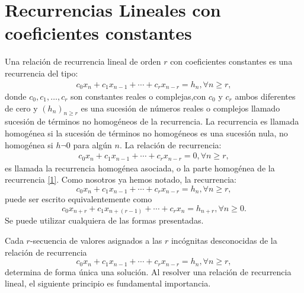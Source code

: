 \section{Recurrencias Lineales con coeficientes constantes}
Una relación de recurrencia lineal de orden $r$ con coeficientes constantes es una recurrencia del tipo:
\begin{align}\label{1}
c_{0}x_{n}+c_{1}x_{n-1}+\cdots+c_{r}x_{n-r}=h_{n},\forall n\geq r,
\end{align}
donde $c_{0},c_{1},\ldots,c_{r}$ son constantes reales o complejas,con $c_{0}$ y $c_{r}$ ambos diferentes de cero y $(h_{n})_{n\geq r}$ es una sucesión de números reales o complejos llamado sucesión de términos no homogéneos de la recurrencia. La recurrencia es llamada homogénea si la sucesión de términos no homogéneos es una sucesión nula, no homogénea si $h\neg 0 $ para algún $n$. La relación de recurrencia:
\begin{align}\label{2}
c_{0}x_{n}+c_{1}x_{n-1}+\cdots+c_{r}x_{n-r}=0,\forall n\geq r,
\end{align}
es llamada la recurrencia homogénea asociada, o la parte homogénea de la recurrencia \eqref{1}. Como nosotros ya hemos notado, la recurrencia:
\begin{equation*}
c_{0}x_{n}+c_{1}x_{n-1}+\cdots+c_{r}x_{n-r}=h_{n},\forall n\geq r,
\end{equation*}
puede ser escrito equivalentemente como
\begin{equation*}
c_{0}x_{n+r}+c_{1}x_{n+(r-1)}+\cdots+c_{r}x_{n}=h_{n+r},\forall n\geq 0.
\end{equation*}
Se puede utilizar cualquiera de las formas presentadas.

\begin{remark}
Cada $r$-secuencia de valores asignados a las $r$ incógnitas desconocidas de la relación de recurrencia
\begin{equation*}
c_{0}x_{n}+c_{1}x_{n-1}+\cdots+c_{r}x_{n-r}=h_{n},\forall n\geq r,
\end{equation*}
determina de forma única una solución. Al resolver una relación de recurrencia lineal, el siguiente principio es fundamental importancia.
\end{remark}

